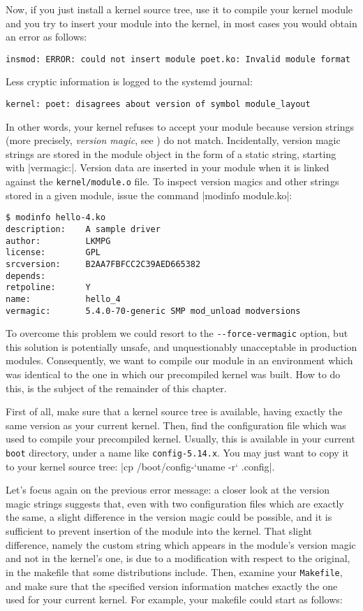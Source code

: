 \documentclass[10pt, oneside]{book}
\begin{document}
Now, if you just install a kernel source tree, use it to compile your kernel module and you try to insert your module into the kernel, in most cases you would obtain an error as follows:

\begin{verbatim}
insmod: ERROR: could not insert module poet.ko: Invalid module format
\end{verbatim}

Less cryptic information is logged to the systemd journal:

\begin{verbatim}
kernel: poet: disagrees about version of symbol module_layout
\end{verbatim}

In other words, your kernel refuses to accept your module because version strings (more precisely, \textit{version magic}, see ) do not match.
Incidentally, version magic strings are stored in the module object in the form of a static string, starting with \cpp|vermagic:|.
Version data are inserted in your module when it is linked against the \verb|kernel/module.o| file.
To inspect version magics and other strings stored in a given module, issue the command \sh|modinfo module.ko|:

\begin{verbatim}
$ modinfo hello-4.ko
description:    A sample driver
author:         LKMPG
license:        GPL
srcversion:     B2AA7FBFCC2C39AED665382
depends:
retpoline:      Y
name:           hello_4
vermagic:       5.4.0-70-generic SMP mod_unload modversions
\end{verbatim}

To overcome this problem we could resort to the \verb|--force-vermagic| option, but this solution is potentially unsafe, and unquestionably unacceptable in production modules.
Consequently, we want to compile our module in an environment which was identical to the one in which our precompiled kernel was built.
How to do this, is the subject of the remainder of this chapter.

First of all, make sure that a kernel source tree is available, having exactly the same version as your current kernel.
Then, find the configuration file which was used to compile your precompiled kernel.
Usually, this is available in your current \verb|boot| directory, under a name like \verb|config-5.14.x|.
You may just want to copy it to your kernel source tree: \sh|cp /boot/config-`uname -r` .config|.

Let's focus again on the previous error message: a closer look at the version magic strings suggests that, even with two configuration files which are exactly the same, a slight difference in the version magic could be possible, and it is sufficient to prevent insertion of the module into the kernel.
That slight difference, namely the custom string which appears in the module's version magic and not in the kernel's one, is due to a modification with respect to the original, in the makefile that some distributions include.
Then, examine your \verb|Makefile|, and make sure that the specified version information matches exactly the one used for your current kernel.
For example, your makefile could start as follows:
\end{document}
